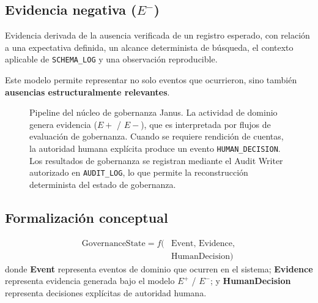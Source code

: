 \documentclass[conference]{IEEEtran}
\begin{document}
\subsection{Evidencia negativa (\texorpdfstring{$E^{-}$}{E-})}
Evidencia derivada de la ausencia verificada de un registro esperado, con relación a una expectativa definida, un alcance determinista de búsqueda, el contexto aplicable de \texttt{SCHEMA\_LOG} y una observación reproducible.

Este modelo permite representar no solo eventos que ocurrieron, sino también \textbf{ausencias estructuralmente relevantes}.

\begin{figure}[ht]
\centering
{}
\caption{Pipeline del núcleo de gobernanza Janus. La actividad de dominio genera evidencia ($E+$ / $E-$), que es interpretada por flujos de evaluación de gobernanza. Cuando se requiere rendición de cuentas, la autoridad humana explícita produce un evento \texttt{HUMAN\_DECISION}. Los resultados de gobernanza se registran mediante el Audit Writer autorizado en \texttt{AUDIT\_LOG}, lo que permite la reconstrucción determinista del estado de gobernanza.}
\label{fig:janus_pipeline}
\end{figure}

\subsection{Formalización conceptual}
\begin{equation}
\begin{split}
\mathrm{GovernanceState}=f(&\mathrm{Event},\,\mathrm{Evidence},\\
&\mathrm{HumanDecision})
\end{split}
\end{equation}
donde \textbf{Event} representa eventos de dominio que ocurren en el sistema; \textbf{Evidence} representa evidencia generada bajo el modelo $E^{+}$ / $E^{-}$; y \textbf{HumanDecision} representa decisiones explícitas de autoridad humana.
\end{document}
